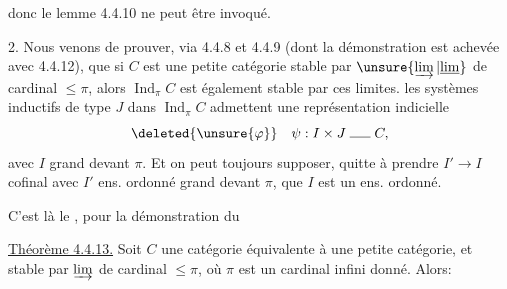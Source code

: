 donc le lemme 4.4.10 ne peut être invoqué.

2. Nous venons de prouver, via 4.4.8 et 4.4.9 (dont la démonstration est achevée avec 4.4.12), que  si $C$ est une petite catégorie stable par $\unsure{\varinjlim|\underline{\lim}}$ de cardinal $\leq\pi$, alors $\operatorname{Ind}_{\pi}C$ est également stable par ces limites.    les  systèmes inductifs de type $J$ dans $\operatorname{Ind}_{\pi}C$  admettent une représentation indicielle
\[
\deleted{\unsure{\varphi}}\quad\psi:I\times J\mathrel{\rule{1.5em}{0.4pt}}C,
\]
avec $I$ grand devant $\pi$. Et on peut toujours supposer, quitte à prendre $I'\longrightarrow I$ cofinal avec $I'$ ens. ordonné grand devant $\pi$, que $I$ est  un ens. ordonné.

C'est là le  , pour la démonstration du

\uline{Théorème 4.4.13.} Soit $C$ une catégorie équivalente à une petite catégorie, et stable par $\varinjlim$ de cardinal $\leq\pi$, où $\pi$ est un cardinal infini donné. Alors: 
